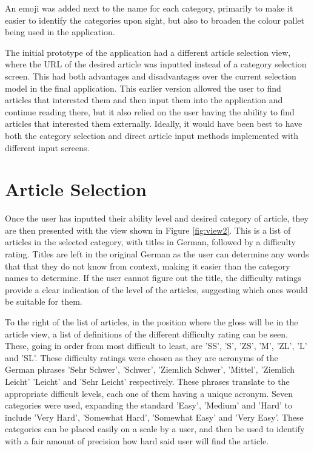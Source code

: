 An emoji was added next to the name for each category, primarily to make it easier to identify the categories upon sight, but also to broaden the colour pallet being used in the application.

The initial prototype of the application had a different article selection view, where the URL of the desired article was inputted instead of a category selection screen. This had both advantages and disadvantages over the current selection model in the final application. This earlier version allowed the user to find articles that interested them and then input them into the application and continue reading there, but it also relied on the user having the ability  to find articles that interested them externally. Ideally, it would have been best to have both the category selection and direct article input methods implemented with different input screens.

\section{Article Selection}

Once the user has inputted their ability level and desired category of article, they are then presented with the view shown in Figure \ref{fig:view2}. This is a list of articles in the selected category, with titles in German, followed by a difficulty rating. Titles are left in the original German as the user can determine any words that that they do not know from context, making it easier than the category names to determine. If the user cannot figure out the title, the difficulty ratings provide a clear indication of the level of the articles, suggesting which ones would be suitable for them. 



To the right of the list of articles, in the position where the gloss will be in the article view, a list of definitions of the different difficulty rating can be seen. These, going in order from most difficult to least, are 'SS', 'S', 'ZS', 'M', 'ZL', 'L' and 'SL'. These difficulty ratings were chosen as they are acronyms of the German phrases 'Sehr Schwer', 'Schwer', 'Ziemlich Schwer', 'Mittel', 'Ziemlich Leicht' 'Leicht' and 'Sehr Leicht' respectively. These phrases translate to the appropriate difficult levels, each one of them having a unique acronym. Seven categories were used, expanding the standard 'Easy', 'Medium' and 'Hard' to include 'Very Hard', 'Somewhat Hard', 'Somewhat Easy' and 'Very Easy'. These categories can be placed easily on a scale by a user, and then be used to identify with a fair amount of precision how hard said user will find the article.

